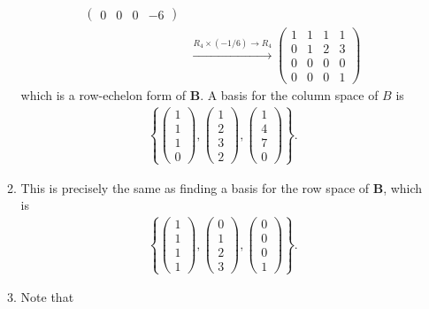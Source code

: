 \documentclass[12pt]{article}
\begin{document}
\begin{enumerate}[label=\textbf{(\alph*)}]
\begin{enumerate}[label=\textbf{(\roman*)}]
\begin{align*}
\begin{pmatrix}
    0 & 0 & 0 & -6
\end{pmatrix}\\
&\xrightarrow{R_4\times \left(-1/6\right)\rightarrow R_4}\begin{pmatrix}
    1 & 1 & 1 & 1 \\
    0 & 1 & 2 & 3 \\
    0 & 0 & 0 & 0 \\
    0 & 0 & 0 & 1
\end{pmatrix}
\end{align*}
which is a row-echelon form of $\mathbf{B}$. A basis for the column space of $B$ is \begin{align*}
    \left\{\begin{pmatrix}
        1\\1\\1\\0
    \end{pmatrix},\begin{pmatrix}
        1\\2\\3\\2
    \end{pmatrix},\begin{pmatrix}
        1\\4\\7\\0
    \end{pmatrix}\right\}.
\end{align*}
\item This is precisely the same as finding a basis for the row space of $\mathbf{B}$, which is \begin{align*}
    \left\{\begin{pmatrix}
        1 \\1\\1\\1
    \end{pmatrix},\begin{pmatrix}
        0\\1\\2\\3
    \end{pmatrix},\begin{pmatrix}
        0\\0\\0\\1
    \end{pmatrix}\right\}.
\end{align*}
\item Note that \begin{align*}

\end{align*}
\end{enumerate}
\end{enumerate}
\end{document}
